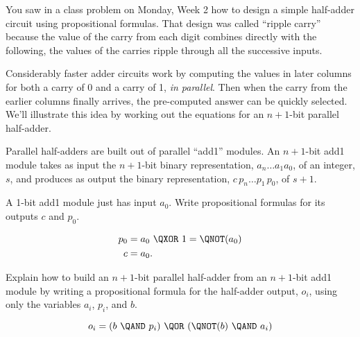 \documentclass[handout]{mcs}
\begin{document}


\begin{problem}
You saw in a class problem on Monday, Week 2 how to design a simple
half-adder circuit using propositional formulas.  That design was called
``ripple carry'' because the value of the carry from each digit combines
directly with the following, the values of the carries ripple through all
the successive inputs.

Considerably faster adder circuits work by computing the values in later
columns for both a carry of 0 and a carry of 1, \emph{in parallel}.  Then
when the carry from the earlier columns finally arrives, the pre-computed
answer can be quickly selected.  We'll illustrate this idea by working out
the equations for an $n+1$-bit parallel half-adder.

Parallel half-adders are built out of parallel ``add1'' modules.  An
$n+1$-bit add1 module takes as input the $n+1$-bit binary representation,
$a_n \dots a_1 a_0$, of an integer, $s$, and produces as output the binary
representation, $c\,p_n\dots p_1\,p_0$, of $s+1$.

\bparts

\ppart A 1-bit add1 module just has input $a_0$.  Write propositional
formulas for its outputs $c$ and $p_0$.

\begin{solution}

\begin{align}
p_0 & = a_0\ \QXOR\ 1 = \QNOT(a_0)\\
c & = a_0.
\end{align}

\end{solution}

\ppart Explain how to build an $n+1$-bit parallel half-adder from an
$n+1$-bit add1 module by writing a propositional formula for the
half-adder output, $o_i$, using only the variables $a_i$, $p_i$, and $b$.

\begin{solution}

\[
o_i  = (b\ \QAND\ p_i)\ \QOR\ (\QNOT(b)\ \QAND\ a_i)
\]

\end{solution}

\eparts


\end{problem}
\end{document}
